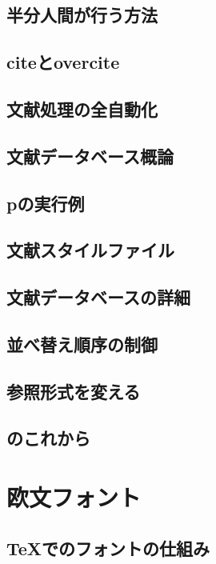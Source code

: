 \documentclass{jsbook}
\begin{document}
\section{半分人間が行う方法}

\section{citeとovercite}

\section{文献処理の全自動化}

\section{文献データベース概論}

\section{p\BibTeX の実行例}

\section{文献スタイルファイル}

\section{文献データベースの詳細}

\section{並べ替え順序の制御}

\section{参照形式を変える}

\section{\BibTeX のこれから}

\chapter{欧文フォント}

\section{TeXでのフォントの仕組み}
\end{document}
